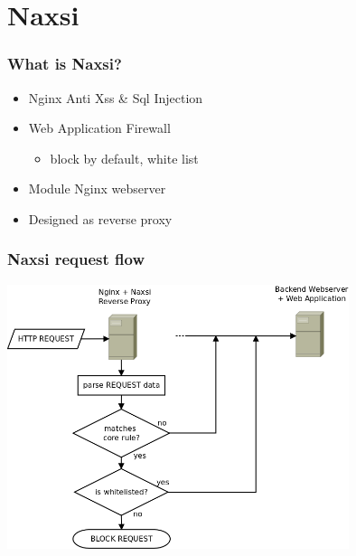 \section{Naxsi}

\begin{frame}
  \frametitle{What is Naxsi?}
   \begin{itemize}
   \item Nginx Anti Xss \& Sql Injection
   \item Web Application Firewall
   \begin{itemize}
        \item block by default, white list
   \end{itemize}
   \item Module Nginx webserver
   \item Designed as reverse proxy
  \end{itemize}
\end{frame}

\begin{frame}
  \frametitle{Naxsi request flow}
    \begin{center} 
      \includegraphics[width=0.75\textwidth]{../paper/images/request_flow.png}
    \end{center}
\end{frame}


